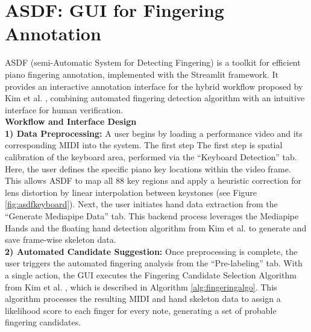 \documentclass{article}
\begin{document}
\section{ASDF: GUI for Fingering Annotation}
ASDF (semi-Automatic System for Detecting Fingering) is a toolkit for efficient piano fingering annotation, implemented with the Streamlit framework. It provides an interactive annotation interface for the hybrid workflow proposed by Kim et al. \cite{kim2025pianovam}, combining automated fingering detection algorithm with an intuitive interface for human verification.
\vspace{1.25mm}\\
\textbf{Workflow and Interface Design}\quad
\vspace{1.25mm}\\
\textbf{1) Data Preprocessing:} A user begins by loading a performance video and its corresponding MIDI into the system. The first step The first step is spatial calibration of the keyboard area, performed via the ``Keyboard Detection'' tab. Here, the user defines the specific piano key locations within the video frame. This allows ASDF to map all 88 key regions and apply a heuristic correction for lens distortion by linear interpolation between keystones (see Figure \ref{fig:asdfkeyboard}). Next, the user initiates hand data extraction from the ``Generate Mediapipe Data'' tab. This backend process leverages the Mediapipe Hands \cite{arXiv20Zhang} and the floating hand detection algorithm from Kim et al. \cite{kim2025pianovam} to generate and save frame-wise skeleton data.\\
\textbf{2) Automated Candidate Suggestion:} Once preprocessing is complete, the user triggers the automated fingering analysis from the ``Pre-labeling'' tab. With a single action, the GUI executes the Fingering Candidate Selection Algorithm from Kim et al. \cite{kim2025pianovam}, which is described in Algorithm \ref{alg:fingeringalgo}. This algorithm processes the resulting MIDI and hand skeleton data to assign a likelihood score to each finger for every note, generating a set of probable fingering candidates.\\
\end{document}
